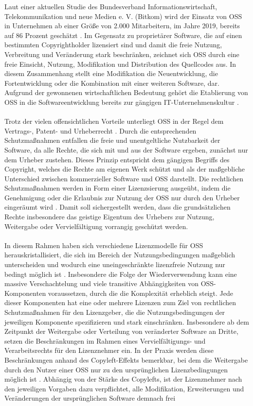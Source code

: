Laut einer aktuellen Studie des Bundesverband Informationswirtschaft, Telekommunikation und neue Medien e. V. (Bitkom) wird der Einsatz von OSS in Unternehmen ab einer Größe von 2.000 Mitarbeitern, im Jahre 2019, bereits auf 86 Prozent geschätzt \cite{bitkom_open_2020}. Im Gegensatz zu proprietärer Software, die auf einen bestimmten Copyrightholder lizensiert sind und damit die freie Nutzung, Verbreitung und Veränderung stark beschränken, zeichnet sich OSS durch eine freie Einsicht, Nutzung, Modifikation und Distribution des Quellcodes aus. In diesem Zusammenhang stellt eine Modifikation die Neuentwicklung, die Fortentwicklung oder die Kombination mit einer weiteren Software, dar. Aufgrund der gewonnenen wirtschaftlichen Bedeutung gehört die Etablierung von OSS in die Softwareentwicklung bereits zur gängigen IT-Unternehmenskultur \cite[S. 21,22]{allmann_open_2019}.\\\\ Trotz der vielen offensichtlichen Vorteile unterliegt OSS in der Regel dem Vertrags-, Patent- und Urheberrecht \cite[S. 28 ff.]{kesler_anpassung_2013}. Durch die entsprechenden Schutzmaßnahmen entfallen die freie und unentgeltliche Nutzbarkeit der Software, da alle Rechte, die sich mit und aus der Software ergeben, zunächst nur dem Urheber zustehen. Dieses Prinzip entspricht dem gängigen Begriffs des Copyright, welches die Rechte am eigenen Werk schützt und als der maßgebliche Unterschied zwischen kommerzieller Software und OSS darstellt. Die rechtlichen Schutzmaßnahmen werden in Form einer Lizenzsierung ausgeübt, indem die Genehmigung oder die Erlaubnis zur Nutzung der OSS nur durch den Urheber eingeräumt wird \cite{wilmer_rechtliche_2021}. Damit soll sichergestellt werden, dass die grundsätzlichen Rechte insbesondere das geistige Eigentum des Urhebers zur Nutzung, Weitergabe oder Vervielfältigung vorrangig geschützt werden.\\\\ In diesem Rahmen haben sich verschiedene Lizenzmodelle für OSS herauskristallisiert, die sich im Bereich der Nutzungsbedingungen maßgeblich unterscheiden und wodurch eine uneingeschränkte lizenzfreie Nutzung nur bedingt möglich ist \cite{wilmer_rechtliche_2021}. Insbesondere die Folge der Wiederverwendung kann eine massive Verschachtelung und viele transitive Abhängigkeiten von OSS-Komponenten voraussetzen, durch die die Komplexität erheblich steigt. Jede dieser Komponenten hat eine oder mehrere Lizenzen zum Ziel von rechtlichen Schutzmaßnahmen für den Lizenzgeber, die die Nutzungsbedingungen der jeweiligen Komponente spezifizieren und stark einschränken. Insbesondere ab dem Zeitpunkt der Weitergabe oder Verteilung von veränderter Software an Dritte, setzen die Beschränkungen im Rahmen eines Vervielfältigungs- und Verarbeitsrechts für den Lizenznehmer ein. In der Praxis werden diese Beschränkungen anhand des Copyleft-Effekts bemerkbar, bei dem die Weitergabe durch den Nutzer einer OSS nur zu den ursprünglichen Lizenzbedingungen möglich ist \cite[S. 184]{sujecki_vertrags-_2005}. Abhängig von der Stärke des Copylefts, ist der Lizenznehmer nach den jeweiligen Vorgaben dazu verpflichtet, alle Modifikation, Erweiterungen und Veränderungen der ursprünglichen Software demnach frei 